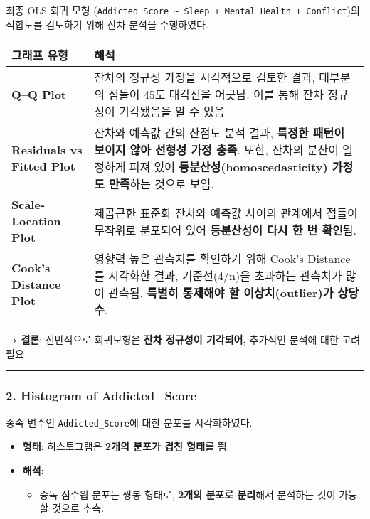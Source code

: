 \documentclass[11pt]{article}
\providecommand{\tightlist}{%
      \setlength{\itemsep}{0pt}\setlength{\parskip}{0pt}}
\begin{document}
최종 OLS 회귀 모형
(\texttt{Addicted\_Score\ \textasciitilde{}\ Sleep\ +\ Mental\_Health\ +\ Conflict})의
적합도를 검토하기 위해 잔차 분석을 수행하였다.

\begin{longtable}[]{@{}
  >{\raggedright\arraybackslash}p{}
  >{\raggedright\arraybackslash}p{}@{}}
\toprule\noalign{}
\begin{minipage}[b]{\linewidth}\raggedright
그래프 유형
\end{minipage} & \begin{minipage}[b]{\linewidth}\raggedright
해석
\end{minipage} \\
\midrule\noalign{}
\endhead
\bottomrule\noalign{}
\endlastfoot
\textbf{Q--Q Plot} & 잔차의 정규성 가정을 시각적으로 검토한 결과,
대부분의 점들이 45도 대각선을 어긋남. 이를 통해 잔차 정규성이 기각됐음을
알 수 있음 \\
\textbf{Residuals vs Fitted Plot} & 잔차와 예측값 간의 산점도 분석 결과,
\textbf{특정한 패턴이 보이지 않아 선형성 가정 충족}. 또한, 잔차의 분산이
일정하게 퍼져 있어 \textbf{등분산성(homoscedasticity) 가정도 만족}하는
것으로 보임. \\
\textbf{Scale-Location Plot} & 제곱근한 표준화 잔차와 예측값 사이의
관계에서 점들이 무작위로 분포되어 있어 \textbf{등분산성이 다시 한 번
확인}됨. \\
\textbf{Cook's Distance Plot} & 영향력 높은 관측치를 확인하기 위해
Cook's Distance를 시각화한 결과, 기준선(4/n)을 초과하는 관측치가 많이
관측됨. \textbf{특별히 통제해야 할 이상치(outlier)가 상당수}. \\
\end{longtable}

\textbf{→ 결론}: 전반적으로 회귀모형은 \textbf{잔차 정규성이 기각되어,}
추가적인 분석에 대한 고려 필요

\begin{center}\rule{0.5\linewidth}{0.5pt}\end{center}

\subsubsection{2. Histogram of
Addicted\_Score}\label{histogram-of-addicted_score}

종속 변수인 \texttt{Addicted\_Score}에 대한 분포를 시각화하였다.

\begin{itemize}
\tightlist
\item
  \textbf{형태}: 히스토그램은 \textbf{2개의 분포가 겹친 형태}를 띔.
\item
  \textbf{해석}:

  \begin{itemize}
  \tightlist
  \item
    중독 점수읩 분포는 쌍봉 형태로, \textbf{2개의 분포로 분리}해서
    분석하는 것이 가능할 것으로 추측.
  \end{itemize}
\end{itemize}
\end{document}
